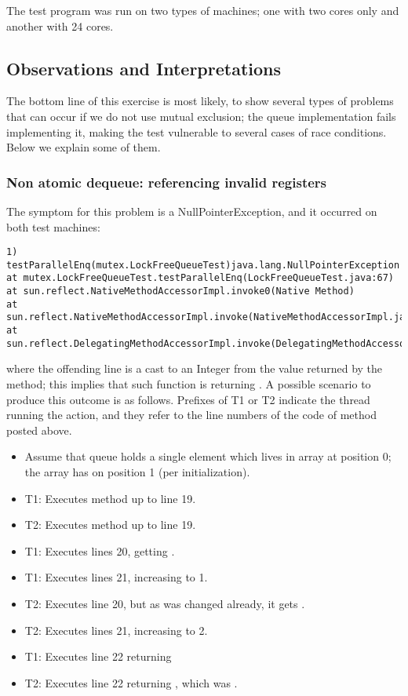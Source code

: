 The test program was run on two types of machines; one with two cores
only and another with 24 cores.

\subsection{Observations and Interpretations}
The bottom line of this exercise is most likely, to show several types
of problems that can occur if we do not use mutual exclusion; the
queue implementation fails implementing it, making the test vulnerable
to several cases of race conditions. Below we explain some of them.

\subsubsection{Non atomic dequeue: referencing invalid registers}

The symptom for this problem is a NullPointerException, and it
occurred on both test machines:

\begin{verbatim}
1) testParallelEnq(mutex.LockFreeQueueTest)java.lang.NullPointerException
at mutex.LockFreeQueueTest.testParallelEnq(LockFreeQueueTest.java:67)
at sun.reflect.NativeMethodAccessorImpl.invoke0(Native Method)
at sun.reflect.NativeMethodAccessorImpl.invoke(NativeMethodAccessorImpl.java:57)
at sun.reflect.DelegatingMethodAccessorImpl.invoke(DelegatingMethodAccessorImpl.java:43)
\end{verbatim}
\hfill

where the offending line is a cast to an Integer from the value
returned by the  method; this implies that such function is
returning . A possible scenario to produce this outcome is as
follows. Prefixes of T1 or T2 indicate the thread running the action,
and they refer to the line numbers of the code of method 
posted above.

\begin{itemize}
\item Assume that queue holds a single element which lives in 
  array at position 0; the array has  on position 1 (per
  initialization).
\item T1: Executes method up to line 19. 
\item T2: Executes method up to line 19. 
\item T1: Executes lines 20, getting .
\item T1: Executes lines 21, increasing  to 1.
\item T2: Executes line 20, but as  was changed already, it
  gets .
\item T2: Executes lines 21, increasing  to 2.
\item T1: Executes line 22 returning 
\item T2: Executes line 22 returning , which was .
\end{itemize}
\hfill

